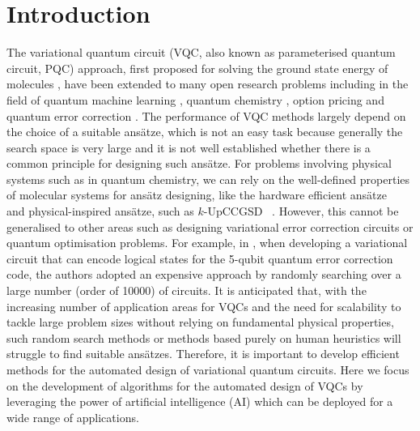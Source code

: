 \documentclass{ieeeaccess}
\begin{document}
\titlepgskip=-15pt

\maketitle

\section{Introduction}
The variational quantum circuit (VQC, also known as parameterised quantum circuit, PQC) approach, first proposed for solving the ground state energy of molecules \cite{peruzzo2014variational}, have been extended to many open research problems including in the field of quantum machine learning \cite{schuldpetruccione2021}, quantum chemistry \cite{RevModPhys.92.015003}, option pricing \cite{2020optionpricing} and quantum error correction \cite{johnson2017qvector, Xu2021-dt}. The performance of VQC methods largely depend on the choice of a suitable ans\"atze, which is not an easy task because generally the search space is very large and it is not well established whether there is a common principle for designing such ans\"atze. For problems involving physical systems such as in quantum chemistry, we can rely on the well-defined properties of molecular systems for ans\"atz designing, like the  hardware efficient ans\"atze~\cite{2017hardwareefficientvqe} and physical-inspired ans\"atze, such as $k$-UpCCGSD~ \cite{physicalinspiredansatze1doi:10.1021/acs.jctc.8b01004}. However, this cannot be generalised to other areas such as designing variational error correction circuits or quantum optimisation problems. For example, in \cite{Xu2021-dt}, when developing a variational circuit that can encode logical states for the 5-qubit quantum error correction code, the authors adopted an expensive approach by randomly searching over a large number (order of 10000) of circuits. It is anticipated that, with the increasing number of application areas for VQCs and the need for scalability to tackle large problem sizes without relying on fundamental physical properties, such random search methods or methods based purely on human heuristics will struggle to find suitable ans\"atzes. Therefore, it is important to develop efficient methods for the automated design of variational quantum circuits. Here we focus on the development of algorithms for the automated design of VQCs by leveraging the power of artificial intelligence (AI) which can be deployed for a wide range of applications.
\end{document}
